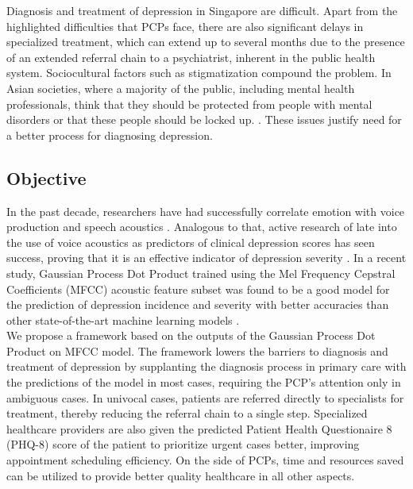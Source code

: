 \documentclass{article}
\begin{document}
	Diagnosis and treatment of depression in Singapore are difficult. Apart from the highlighted difficulties that PCPs face, there are also significant delays in specialized treatment, which can extend up to several months due to the presence of an extended referral chain to a psychiatrist, inherent in the public health system. Sociocultural factors such as stigmatization compound the problem. In Asian societies, where a majority of the public, including mental health professionals, think that they should be protected from people with mental disorders or that these people should be locked up. \cite{chong2009}. These issues justify need for a better process for diagnosing depression. \\
	
	\subsection{Objective}
	In the past decade, researchers have had successfully correlate emotion with voice production and speech acoustics \cite{uwa2001}. 
    Analogous to that, active research of late into the use of voice acoustics as predictors of clinical depression scores has seen success, proving that it is an effective indicator of depression severity \cite{jov2016}. In a recent study, Gaussian Process Dot Product trained using the Mel Frequency Cepstral Coefficients (MFCC) acoustic feature subset was found to be a good model for the prediction of depression incidence and severity with better accuracies than other state-of-the-art machine learning models \cite{cs42462016}.\\

	We propose a framework based on the outputs of the Gaussian Process Dot Product on MFCC model. The framework lowers the barriers to diagnosis and treatment of depression by supplanting the diagnosis process in primary care with the predictions of the model in most cases, requiring the PCP's attention only in ambiguous cases. In univocal cases, patients are referred directly to specialists for treatment, thereby reducing the referral chain to a single step. Specialized healthcare providers are also given the predicted Patient Health Questionaire 8 (PHQ-8) score of the patient to prioritize urgent cases better, improving appointment scheduling efficiency. On the side of PCPs, time and resources saved can be utilized to provide better quality healthcare in all other aspects.
	
\end{document}
